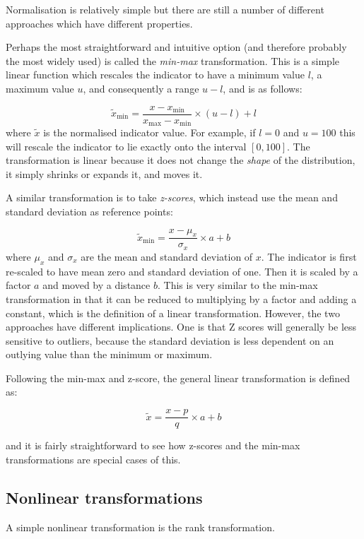 \documentclass[
]{book}
\begin{document}
Normalisation is relatively simple but there are still a number of different approaches which have different properties.

Perhaps the most straightforward and intuitive option (and therefore probably the most widely used) is called the \emph{min-max} transformation. This is a simple linear function which rescales the indicator to have a minimum value \(l\), a maximum value \(u\), and consequently a range \(u-l\), and is as follows:

\[ \tilde{x}_{\text{min}} = \frac{ x - x_{\text{min}} }{ x_{\text{max}} - x_{\text{min}} } \times (u-l) + l\]
where \(\tilde{x}\) is the normalised indicator value. For example, if \(l=0\) and \(u=100\) this will rescale the indicator to lie exactly onto the interval \([0, 100]\). The transformation is linear because it does not change the \emph{shape} of the distribution, it simply shrinks or expands it, and moves it.

A similar transformation is to take \emph{z-scores}, which instead use the mean and standard deviation as reference points:

\[ \tilde{x}_{\text{min}} = \frac{ x - \mu_x }{ \sigma_x } \times a + b\]
where \(\mu_x\) and \(\sigma_x\) are the mean and standard deviation of \(x\). The indicator is first re-scaled to have mean zero and standard deviation of one. Then it is scaled by a factor \(a\) and moved by a distance \(b\). This is very similar to the min-max transformation in that it can be reduced to multiplying by a factor and adding a constant, which is the definition of a linear transformation. However, the two approaches have different implications. One is that Z scores will generally be less sensitive to outliers, because the standard deviation is less dependent on an outlying value than the minimum or maximum.

Following the min-max and z-score, the general linear transformation is defined as:

\[ \tilde{x} = \frac{ x - p }{ q } \times a + b\]

and it is fairly straightforward to see how z-scores and the min-max transformations are special cases of this.

\hypertarget{nonlinear-transformations}{%
\subsection{Nonlinear transformations}\label{nonlinear-transformations}}

A simple nonlinear transformation is the rank transformation.
\end{document}
